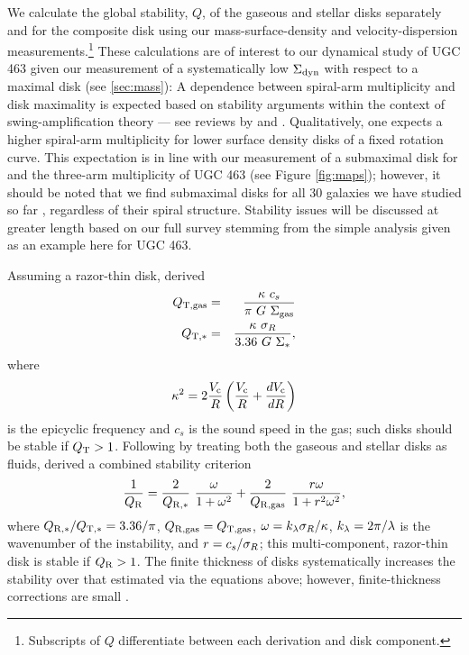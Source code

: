 \documentclass[apj,iop,numberedappendix]{emulateapj}
\begin{document}
We calculate the global stability, $Q$, of the gaseous and stellar disks
separately and for the composite disk using our mass-surface-density and
velocity-dispersion measurements.\footnote{
%
Subscripts of $Q$ differentiate between each derivation and disk component.
%
}  These calculations are of interest to our dynamical study of UGC 463 given
our measurement of a systematically low $\Sigma_{\rm dyn}$ with respect to a maximal disk
(see \sect \ref{sec:mass}):  A dependence between spiral-arm multiplicity and
disk maximality is expected \citep{1981seng.proc..111T, 1987A&A...179...23A}
based on stability arguments within the context of swing-amplification theory
--- see reviews by \citet{1984PhR...114..319A} and \citet{2010arXiv1006.4855S}.
Qualitatively, one expects a higher spiral-arm multiplicity for lower surface
density disks of a fixed rotation curve.  This expectation is in line with our
measurement of a submaximal disk for and the three-arm multiplicity of UGC 463
(see Figure \ref{fig:maps}); however, it should be noted that we find
submaximal disks for all 30 galaxies we have studied so far
\citep[\pV;][]{TPKMPhD}, regardless of their spiral structure.  Stability issues
will be discussed at greater length based on our full survey stemming from the
simple analysis given as an example here for UGC 463.

Assuming a razor-thin disk, \citet{1964ApJ...139.1217T} derived
%
\begin{eqnarray}
%
\qtg & = & \frac{\kappa\ c_s}{\pi\ G\ \sdg} \label{eq:qtg}\\
%
\qts & = & \frac{\kappa\ \sigr}{3.36\ G\ \sds}, \label{eq:qts}
%
\end{eqnarray}
%
where
%
\begin{equation}
%
\kappa^2 = 2\frac{\vc}{R}\left( \frac{\vc}{R} + \frac{d\vc}{dR}\right)
%
\label{eq:kap}
%
\end{equation}
%
is the epicyclic frequency and $c_s$ is the sound speed in the gas; such disks
should be stable if $Q_{\rm T} > 1$.  Following \citet{1984ApJ...276..114J} by
treating both the gaseous and stellar disks as fluids,
\citet{2001MNRAS.323..445R} derived a combined stability criterion
%
\begin{equation}
%
\frac{1}{\qr} = \frac{2}{\qrs}\ \frac{\omega}{1+\omega^2} + \frac{2}{\qrg}\
\frac{r\omega}{1+r^2\omega^2},
%
\label{eq:qr}
%
\end{equation}
%
where $Q_{{\rm R,}\ast}/Q_{{\rm T,}\ast} = 3.36/\pi$, $Q_{\rm R,gas} = Q_{\rm T,gas}$, $\omega = k_{\lambda}\sigma_R/\kappa$, $k_{\lambda} =
2\pi/\lambda$ is the wavenumber of the instability, and $r= c_s/\sigma_R$; this
multi-component, razor-thin disk is stable if $Q_{\rm R} > 1$.  The finite thickness
of disks systematically increases the stability over that estimated via the
equations above; however, finite-thickness corrections are small
\citep{1992MNRAS.256..307R}.
\end{document}
